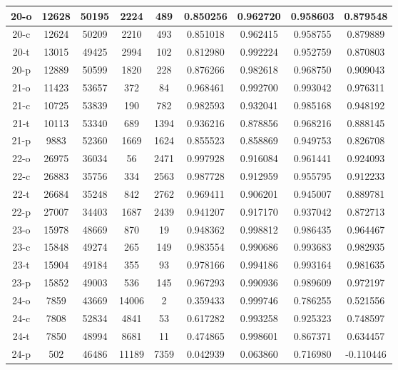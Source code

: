 \begin{longtable}[!h]{|c|c|c|c|c|c|c|c|c|}
	\hline	20-o	&	12628	&	50195	&	2224	&	489	&	0.850256	&	0.962720	&	0.958603	&	0.879548	\\
	\hline	20-c	&	12624	&	50209	&	2210	&	493	&	0.851018	&	0.962415	&	0.958755	&	0.879889	\\
	\hline	\rowcolor{bad} 20-t	&	13015	&	49425	&	2994	&	102	&	0.812980	&	0.992224	&	0.952759	&	0.870803	\\
	\hline	\rowcolor{closest} 20-p	&	12889	&	50599	&	1820	&	228	&	0.876266	&	0.982618	&	0.968750	&	0.909043	\\

	\hline	\rowcolor{closest} 21-o	&	11423	&	53657	&	372	&	84	&	0.968461	&	0.992700	&	0.993042	&	0.976311	\\
	\hline	21-c	&	10725	&	53839	&	190	&	782	&	0.982593	&	0.932041	&	0.985168	&	0.948192	\\
	\hline	21-t	&	10113	&	53340	&	689	&	1394	&	0.936216	&	0.878856	&	0.968216	&	0.888145	\\
	\hline	\rowcolor{bad} 21-p	&	9883	&	52360	&	1669	&	1624	&	0.855523	&	0.858869	&	0.949753	&	0.826708	\\

	\hline	\rowcolor{closest} 22-o	&	26975	&	36034	&	56	&	2471	&	0.997928	&	0.916084	&	0.961441	&	0.924093	\\
	\hline	22-c	&	26883	&	35756	&	334	&	2563	&	0.987728	&	0.912959	&	0.955795	&	0.912233	\\
	\hline	22-t	&	26684	&	35248	&	842	&	2762	&	0.969411	&	0.906201	&	0.945007	&	0.889781	\\
	\hline	\rowcolor{bad} 22-p	&	27007	&	34403	&	1687	&	2439	&	0.941207	&	0.917170	&	0.937042	&	0.872713	\\

	\hline	23-o	&	15978	&	48669	&	870	&	19	&	0.948362	&	0.998812	&	0.986435	&	0.964467	\\
	\hline	\rowcolor{closest} 23-c	&	15848	&	49274	&	265	&	149	&	0.983554	&	0.990686	&	0.993683	&	0.982935	\\
	\hline	23-t	&	15904	&	49184	&	355	&	93	&	0.978166	&	0.994186	&	0.993164	&	0.981635	\\
	\hline	\rowcolor{bad} 23-p	&	15852	&	49003	&	536	&	145	&	0.967293	&	0.990936	&	0.989609	&	0.972197	\\

	\hline	24-o	&	7859	&	43669	&	14006	&	2	&	0.359433	&	0.999746	&	0.786255	&	0.521556	\\
	\hline	\rowcolor{closest} 24-c	&	7808	&	52834	&	4841	&	53	&	0.617282	&	0.993258	&	0.925323	&	0.748597	\\
	\hline	24-t	&	7850	&	48994	&	8681	&	11	&	0.474865	&	0.998601	&	0.867371	&	0.634457	\\
	\hline	\rowcolor{bad} 24-p	&	502	&	46486	&	11189	&	7359	&	0.042939	&	0.063860	&	0.716980	&	-0.110446	\\


\end{longtable}
